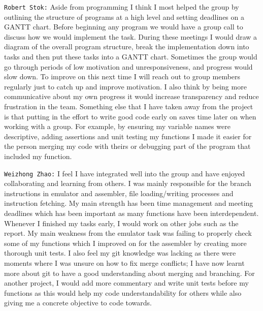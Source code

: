 \documentclass[11pt]{article}
\begin{document}
\texttt{Robert Stok:} Aside from programming I think I most helped the group by outlining the structure of programs at a high level and setting deadlines on a GANTT chart. Before beginning any program we would have a group call to discuss how we would implement the task. During these meetings I would draw a diagram of the overall program structure, break the implementation down into tasks and then put these tasks into a GANTT chart. Sometimes the group would go through periods of low motivation and unresponsiveness, and progress would slow down. To improve on this next time I will reach out to group members regularly just to catch up and improve motivation. I also think by being more communicative about my own progress it would increase transparency and reduce frustration in the team. Something else that I have taken away from the project is that putting in the effort to write good code early on saves time later on when working with a group. For example, by ensuring my variable names were descriptive, adding assertions and unit testing my functions I made it easier for the person merging my code with theirs or debugging part of the program that included my function.
 

\texttt{Weizhong Zhao:} I feel I have integrated well into the group and have enjoyed collaborating and learning from others. I was mainly responsible for the branch instructions in emulator and assembler, file loading/writing processes and instruction fetching. My main strength has been time management and meeting deadlines which has been important as many functions have been interdependent. Whenever I finished my tasks early, I would work on other jobs such as the report. My main weakness from the emulator task was failing to properly check some of my functions which I improved on for the assembler by creating more thorough unit tests. I also feel my git knowledge was lacking as there were moments where I was unsure on how to fix merge conflicts; I have now learnt more about git to have a good understanding about merging and branching. For another project, I would add more commentary and write unit tests before my functions as this would help my code understandability for others while also giving me a concrete objective to code towards.
\end{document}
